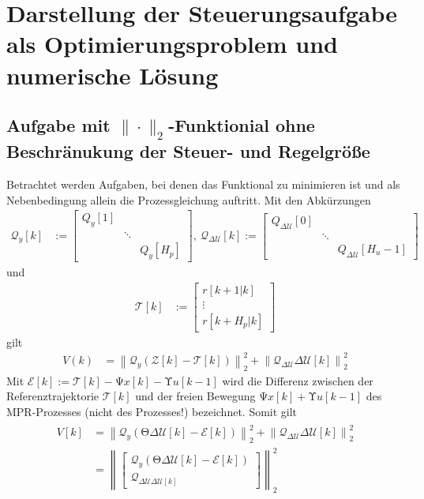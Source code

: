 \section{Darstellung der Steuerungsaufgabe als Optimierungsproblem und numerische Lösung}
\subsection{Aufgabe mit $\|\cdot\|_2$-Funktionial ohne Beschränukung der Steuer- und Regelgröße}
\label{subsec:aufgabe_quad_ohne_beschr}
Betrachtet werden Aufgaben, bei denen das Funktional  zu minimieren ist und als Nebenbedingung allein die Prozessgleichung
 auftritt.
Mit den Abkürzungen
\begin{align*}
	\mathcal{Q}_{y}[k] & :=\begin{bmatrix}
	Q_{y}[1]	& 			& 	\\
				& \ddots	&	\\
				&			& Q_{y}[H_p]
	\end{bmatrix},\ \mathcal{Q}_{\Delta\mathcal{U}}[k]:= \begin{bmatrix}
	Q_{\Delta\mathcal{U}}[0]	&			&	\\
								& \ddots	& 	\\
								&			& Q_{\Delta\mathcal{U}}[H_u-1]
	\end{bmatrix}
\end{align*}
und
\begin{align*}
	\mathcal{T}[k] & := \begin{bmatrix}
	r[k+1|k]\\
	\vdots\\
	r[k+H_p|k]
	\end{bmatrix}
\end{align*}
gilt
\begin{align}
	V(k) & = \left\| \mathcal{Q}_{y}\left(\mathcal{Z}[k]-\mathcal{T}[k]\right) \right\|_2^2 + \left\| \mathcal{Q}_{\Delta\mathcal{U}}\Delta\mathcal{U}[k] \right\|_2^2
\end{align}
Mit $\mathcal{E}[k]:=\mathcal{T}[k]-\mathrm{\Psi} x[k]-\mathrm{\Upsilon} u[k-1]$ wird die Differenz zwischen der Referenztrajektorie $\mathcal{T}[k]$ und der freien Bewegung
$\mathrm{\Psi} x[k]+\mathrm{\Upsilon} u[k-1]$ des \ac{MPR}-Prozesses (nicht des Prozesses!) bezeichnet. Somit gilt
\begin{align}
\begin{split}\label{eqn:kap_4_quad_kostenfunktional_ohne_beschr}
	V[k] & = \left\| \mathcal{Q}_{y}\left(\mathrm{\Theta}\Delta\mathcal{U}[k]-\mathcal{E}[k]\right) \right\|_2^2 + \left\| \mathcal{Q}_{\Delta\mathcal{U}}\Delta\mathcal{U}[k]
	\right\|_2^2\\
	& = \left\| \begin{bmatrix} \mathcal{Q}_y\left(\mathrm{\Theta}\Delta\mathcal{U}[k] - \mathcal{E}[k]\right)\\ \mathcal{Q}_{\Delta\mathcal{U}\Delta\mathcal{U}[k]} \end{bmatrix}
	\right\|_2^2
\end{split}
\end{align}
